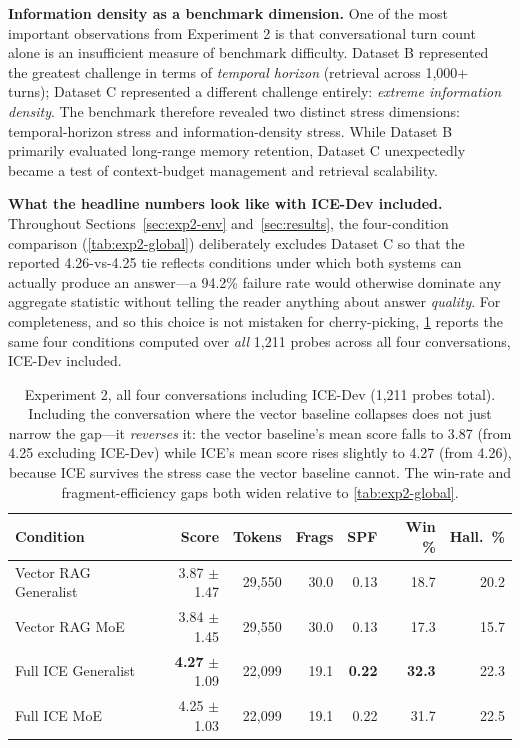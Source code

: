\documentclass[11pt,a4paper]{article}
\begin{document}
\textbf{Information density as a benchmark dimension.} One of the most important observations from Experiment 2 is that conversational turn count alone is an insufficient measure of benchmark difficulty. Dataset B represented the greatest challenge in terms of \emph{temporal horizon} (retrieval across 1{,}000+ turns); Dataset C represented a different challenge entirely: \emph{extreme information density}. The benchmark therefore revealed two distinct stress dimensions: temporal-horizon stress and information-density stress. While Dataset B primarily evaluated long-range memory retention, Dataset C unexpectedly became a test of context-budget management and retrieval scalability.

\textbf{What the headline numbers look like with ICE-Dev included.} Throughout Sections~\ref{sec:exp2-env} and~\ref{sec:results}, the four-condition comparison (\cref{tab:exp2-global}) deliberately excludes Dataset C so that the reported 4.26-vs-4.25 tie reflects conditions under which both systems can actually produce an answer---a 94.2\% failure rate would otherwise dominate any aggregate statistic without telling the reader anything about answer \emph{quality}. For completeness, and so this choice is not mistaken for cherry-picking, \cref{tab:exp2-alldata} reports the same four conditions computed over \emph{all} 1{,}211 probes across all four conversations, ICE-Dev included.

\begin{table}[htbp]
\centering
\small
\caption{Experiment 2, all four conversations including ICE-Dev (1{,}211 probes total). Including the conversation where the vector baseline collapses does not just narrow the gap---it \emph{reverses} it: the vector baseline's mean score falls to 3.87 (from 4.25 excluding ICE-Dev) while ICE's mean score rises slightly to 4.27 (from 4.26), because ICE survives the stress case the vector baseline cannot. The win-rate and fragment-efficiency gaps both widen relative to \cref{tab:exp2-global}.}
\label{tab:exp2-alldata}
\begin{tabular}{@{}lrrrrrr@{}}
\toprule
\textbf{Condition} & \textbf{Score} & \textbf{Tokens} & \textbf{Frags} & \textbf{SPF} & \textbf{Win \%} & \textbf{Hall.\ \%} \\
\midrule
Vector RAG Generalist & 3.87 $\pm$ 1.47 & 29{,}550 & 30.0 & 0.13 & 18.7 & 20.2 \\
Vector RAG MoE        & 3.84 $\pm$ 1.45 & 29{,}550 & 30.0 & 0.13 & 17.3 & 15.7 \\
Full ICE Generalist   & \textbf{4.27} $\pm$ 1.09 & 22{,}099 & 19.1 & \textbf{0.22} & \textbf{32.3} & 22.3 \\
Full ICE MoE          & 4.25 $\pm$ 1.03 & 22{,}099 & 19.1 & 0.22 & 31.7 & 22.5 \\
\bottomrule
\end{tabular}
\end{table}
\end{document}
